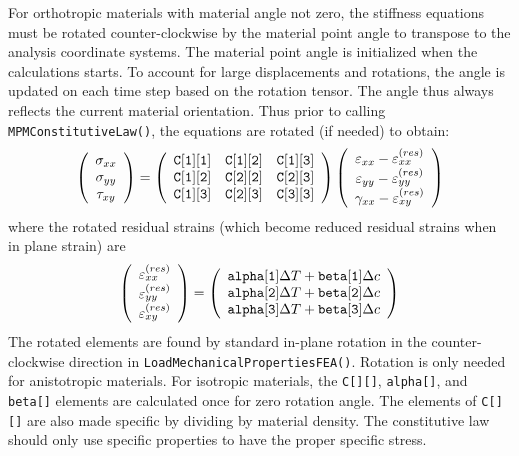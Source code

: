 \documentclass[11pt]{article}
\def\code#1{{\small\tt #1}}
\def\DT{\Delta T}
\def\e#1{\varepsilon_{#1}}
\def\er#1{\varepsilon_{#1}^{(res)}}
\def\g#1{\gamma_{#1}}
\def\s#1{\sigma_{#1}}
\def\symmat#1#2#3#4#5#6{\left(\begin{array}{ccc} #1 & #2 & #3 \\ #2 & #4 & #5 \\
                                                      #3 & #5 & #6 \end{array}\right)}
\def\t#1{\tau_{#1}}
\def\vvec#1#2#3{\left(\begin{array}{ccc} #1 \\ #2 \\ #3 \end{array}\right)}
\begin{document}
For orthotropic materials with material angle not zero, the stiffness equations must be rotated counter-clockwise by the material point angle to transpose to the analysis coordinate systems. The material point angle is initialized when the calculations starts. To account for large displacements and rotations, the angle is updated on each time step based on the rotation tensor. The angle thus always reflects the current material orientation. Thus prior to calling \code{MPMConstitutiveLaw()}, the equations are rotated (if needed) to obtain:
\begin{equation}
      \vvec{\s{xx}}{\s{yy}}{\t{xy}} = \symmat{\code{C[1][1]}}{\code{C[1][2]}}
                      {\code{C[1][3]}}{\code{C[2][2]}}{\code{C[2][3]}}{\code{C[3][3]}}
          \vvec{\e{xx} - \er{xx}}{\e{yy} - \er{yy}}{\g{xx}-\er{xy}}
 \end{equation}
 where the rotated residual strains (which become reduced residual strains when in plane strain) are
\begin{equation}
\left(\begin{array}{c} \er{xx} \\ \er{yy} \\ \er{xy} \end{array}\right)
       =  \left(\begin{array}{c}
	\code{alpha[1]}\DT + \code{beta[1]}\Delta c \\
	\code{alpha[2]}\DT + \code{beta[2]}\Delta c \\
	\code{alpha[3]}\DT + \code{beta[3]}\Delta c  \end{array}\right)
\end{equation}
 The rotated elements are found by standard in-plane rotation in the counter-clockwise direction in \code{LoadMechanicalPropertiesFEA()}. Rotation is only needed for anistotropic materials. For isotropic materials, the \code{C[][]}, \code{alpha[]}, and \code{beta[]} elements are calculated once for zero rotation angle. The elements of \code{C[][]} are also made specific by dividing by material density. The constitutive law should only use specific properties to have the proper specific stress.
 
\end{document}
